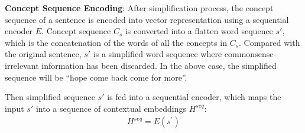 \textbf{Concept Sequence Encoding}:
After simplification process, the concept sequence of a sentence
is encoded into vector representation using a sequential encoder $E$. 
Concept sequence $C_s$ is converted into a flatten word sequence $s'$,
which is the concatenation of the words of all the concepts in $C_s$.
Compared with the original sentence, $s'$ is a simplified word sequence
where commonsense-irrelevant information has been discarded. 
In the above case, the simplified sequence will be 
``hope come back come for more''. 

Then simplified sequence $s'$ is fed into a sequential encoder,
which maps the input $s'$ into a sequence
of contextual embeddings $H^{seq}$:
\begin{equation}
\begin{aligned}
 H^{seq} = E\left(s^{'}\right)
\end{aligned}
\end{equation}
\noindent

